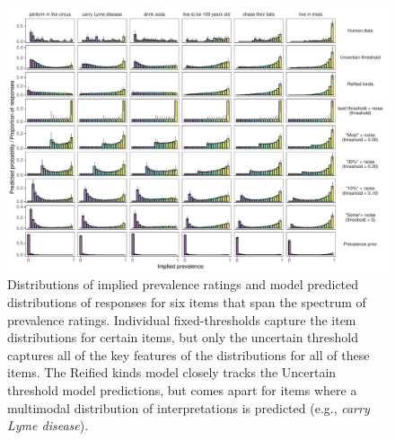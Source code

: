 \documentclass[floatsintext,doc]{apa6}
\begin{document}
\begin{figure}
\centering
\includegraphics{figs/genint-fullDistributions-variousFixeds-1.pdf}
\caption{Distributions of implied prevalence ratings and model predicted distributions of responses for six items that span the spectrum of prevalence ratings. Individual fixed-thresholds capture the item distributions for certain items, but only the uncertain threshold captures all of the key features of the distributions for all of these items. The Reified kinds model closely tracks the Uncertain threshold model predictions, but comes apart for items where a multimodal distribution of interpretations is predicted (e.g., \emph{carry Lyme disease}).
}
\label{fig:genint-modelingResults-bars}
\end{figure}
\end{document}
